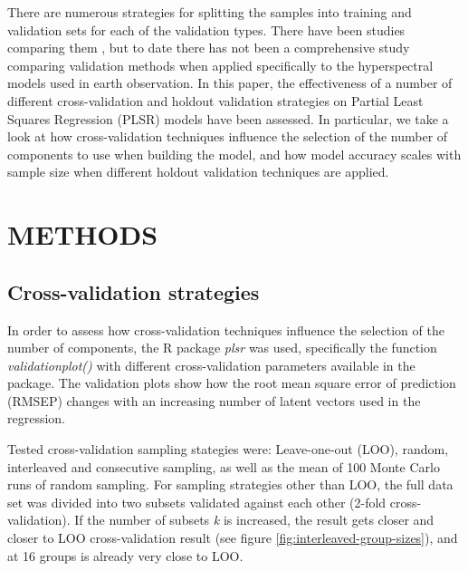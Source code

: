 \documentclass{isprs}
\begin{document}
There are numerous strategies for splitting the samples into training and validation sets for each of the validation types. There have been studies comparing them \cite{clark2003boosted}, but to date there has not been a comprehensive study comparing validation methods when applied specifically to the hyperspectral models used in earth observation. In this paper, the effectiveness of a number of different cross-validation and holdout validation strategies on Partial Least Squares Regression (PLSR) models have been assessed. In particular, we take a look at how cross-validation techniques influence the selection of the number of components to use when building the model, and how model accuracy scales with sample size when different holdout validation techniques are applied.

\section{METHODS}\label{sec:METHODS}

\subsection{Cross-validation strategies}\label{sec:Cross-validation strategies}

In order to assess how cross-validation techniques influence the selection of the number of components, the R package \textit{plsr} was used, specifically the function \textit{validationplot()} with different cross-validation parameters available in the package. The validation plots show how the root mean square error of prediction (RMSEP) changes with an increasing number of latent vectors used in the regression.

Tested cross-validation sampling stategies were: Leave-one-out (LOO), random, interleaved and consecutive sampling, as well as the mean of 100 Monte Carlo runs of random sampling. For sampling strategies other than LOO, the full data set was divided into two subsets validated against each other (2-fold cross-validation). If the number of subsets \textit{k} is increased, the result gets closer and closer to LOO cross-validation result (see figure \ref{fig:interleaved-group-sizes}), and at 16 groups is already very close to LOO.
\end{document}

